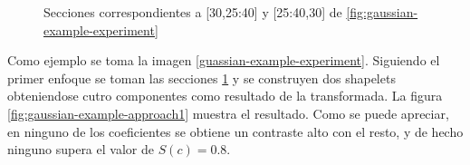 \begin{figure}
	\centering
	\caption{ Secciones correspondientes a [30,25:40] y [25:40,30] de \ref{fig:gaussian-example-experiment}} \label{fig:lines-experiment}
\end{figure}

Como ejemplo se toma la imagen \ref{guassian-example-experiment}. Siguiendo el primer enfoque se toman las secciones
\ref{fig:lines-experiment} y se construyen dos shapelets obteniendose cutro componentes como resultado de la 
transformada. La figura \ref{fig:gaussian-example-approach1} muestra el resultado. Como se puede apreciar, en ninguno de 
los coeficientes se obtiene un contraste alto con el resto, y de hecho ninguno supera el valor de $S(c)=0.8$.

